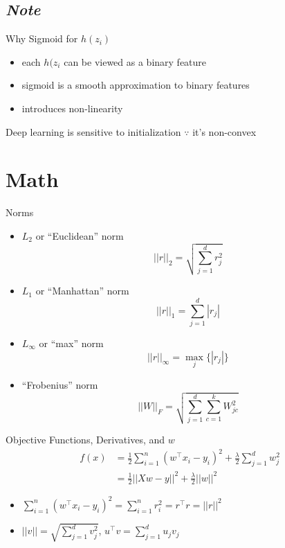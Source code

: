 \documentclass[10pt,landscape,a4paper]{article}
\begin{document}
\begin{multicols*}{5}
\subsection{\emph{Note}}
Why Sigmoid for \(h(z_i)\)
\begin{itemize}
    \item each \(h(z_i\) can be viewed as a binary feature
    \item sigmoid is a smooth approximation to binary features
    \item introduces non-linearity
\end{itemize}
Deep learning is sensitive to initialization \(\because\) it's non-convex

\section{Math}
Norms
\begin{itemize}
    \item \(L_2\) or ``Euclidean'' norm
    \begin{equation*}
         ||r||_2 = \sqrt{\sum_{j=1}^{d} r_j^2}
    \end{equation*}
    \item \(L_1\) or ``Manhattan'' norm
    \begin{equation*}
        ||r||_1 = \sum_{j=1}^{d} |r_j|
    \end{equation*}
    \item \(L_{\infty}\) or ``max'' norm
    \begin{equation*}
        ||r||_{\infty} = \max_j{\{|r_j|}\}
    \end{equation*}
    \item ``Frobenius'' norm
    \begin{equation*}
        ||W||_F = \sqrt{\sum_{j=1}^{d} \sum_{c=1}^{k} W_{jc}^2}
    \end{equation*}
\end{itemize}
Objective Functions, Derivatives, and \(w\)
\begin{align*}
   f(x) &= \frac{1}{2}\sum\limits_{i=1}^{n} (w^\intercal x_i - y_i)^2 + \frac{\lambda}{2} \sum\limits_{j=1}^{d} w_j^2 \\
   &= \frac{1}{2} ||Xw-y||^2 + \frac{\lambda}{2} ||w||^2
\end{align*}
\begin{itemize}
    \item \(\sum\limits_{i=1}^{n} (w^\intercal x_i - y_i)^2 = \sum\limits_{i=1}^{n} r_i^2 = r^\intercal r = ||r||^2\)
    \item \(||v|| = \sqrt{\sum\limits_{j=1}^{d} v_j^2}\), \(u^\intercal v = \sum\limits_{j=1}^{d} u_j v_j\)

\end{itemize}
\end{multicols*}
\end{document}
